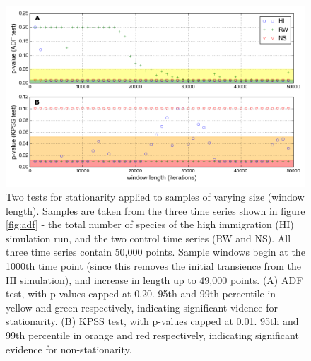 
\newpage

\begin{figure}[ht!]
	\centering
	\includegraphics[width=0.80\linewidth]{"./chapters/chapter04b/figures/Rtests/stat_tests_v_wl"}
     \caption{Two tests for stationarity applied to samples of varying size (window length). Samples are taken from the three time series shown in figure \ref{fig:adf} - the total number of species of the high immigration (HI) simulation run, and the two control time series (RW and NS). All three time series contain 50,000 points. Sample windows begin at the 1000th time point (since this removes the initial transience from the HI simulation), and increase in length up to 49,000 points. (A) ADF test, with p-values capped at 0.20. 95th and 99th percentile in yellow and green respectively, indicating significant vidence for stationarity. (B) KPSS test, with p-values capped at 0.01. 95th and 99th percentile in orange and red respectively, indicating significant evidence for non-stationarity.} 
     \label{fig:stat_tests_v_wl}   
\end{figure}


